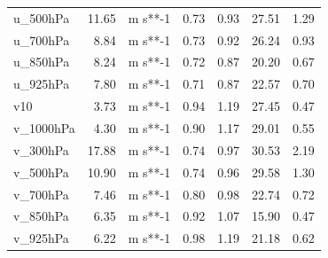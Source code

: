\begin{longtable}{lrrrrrr}
 u\_500hPa &   11.65 & m s**-1 &         0.73 &           0.93 &        27.51 &                      1.29 \\
 u\_700hPa &    8.84 & m s**-1 &         0.73 &           0.92 &        26.24 &                      0.93 \\
 u\_850hPa &    8.24 & m s**-1 &         0.72 &           0.87 &        20.20 &                      0.67 \\
 u\_925hPa &    7.80 & m s**-1 &         0.71 &           0.87 &        22.57 &                      0.70 \\
       v10 &    3.73 & m s**-1 &         0.94 &           1.19 &        27.45 &                      0.47 \\
v\_1000hPa &    4.30 & m s**-1 &         0.90 &           1.17 &        29.01 &                      0.55 \\
 v\_300hPa &   17.88 & m s**-1 &         0.74 &           0.97 &        30.53 &                      2.19 \\
 v\_500hPa &   10.90 & m s**-1 &         0.74 &           0.96 &        29.58 &                      1.30 \\
 v\_700hPa &    7.46 & m s**-1 &         0.80 &           0.98 &        22.74 &                      0.72 \\
 v\_850hPa &    6.35 & m s**-1 &         0.92 &           1.07 &        15.90 &                      0.47 \\
 v\_925hPa &    6.22 & m s**-1 &         0.98 &           1.19 &        21.18 &                      0.62 \\
\end{longtable}
